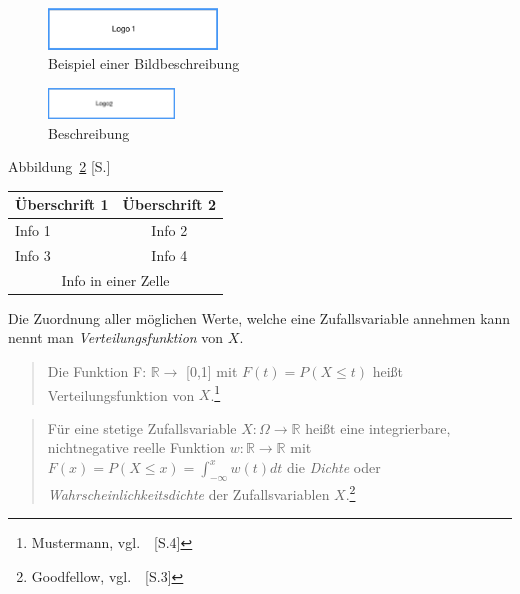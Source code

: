 \begin{figure}[htb]
 \centering
 \includegraphics[width=0.4\textwidth,angle=45]{abb/logo1}
 \caption[Beispiel einer Bildbeschreibung]{Beispiel einer Bildbeschreibung\footnotemark}
\label{fig:beispiel1}
\end{figure}

\begin{figure}[htb]
 \centering
 \includegraphics[width=0.3\textwidth,angle=0]{abb/logo2}
 \caption[Beschreibung]{Beschreibung}
\label{fig:Beschreibung}
\end{figure}

Abbildung~\ref{fig:Beschreibung} [S.\pageref{fig:Beschreibung}]

\begin{center}
  \begin{tabular}{ | l | c | }
    \hline
    Überschrift 1 & Überschrift 2 \\ \hline \hline
    Info 1 & Info 2 \\ \hline
    Info 3 & Info 4 \\ \hline
    \hline
    \multicolumn{2}{|c|}{Info in einer Zelle} \\
    \hline
  \end{tabular}
\end{center}




Die Zuordnung aller möglichen Werte, welche eine Zufallsvariable annehmen kann nennt man \emph{Verteilungsfunktion} von $X$.

\begin{quotation}
Die Funktion F: $\mathbb{R} \rightarrow$ [0,1] mit $F(t) = P (X \le t)$ heißt Verteilungsfunktion von $X$.\footnote{Mustermann, vgl.~\cite{gfnips16}~[S.4]}
\end{quotation}

\begin{quotation}
Für eine stetige Zufallsvariable $X: \Omega \rightarrow \mathbb{R}$ heißt eine integrierbare, nichtnegative reelle Funktion $w: \mathbb{R} \rightarrow \mathbb{R}$ mit $F(x) = P(X \le x) = \int_{-\infty}^{x} w(t)dt$ die \emph{Dichte} oder \emph{Wahrscheinlichkeitsdichte} der Zufallsvariablen $X$.\footnote{Goodfellow, vgl.~\cite{gfg14}~[S.3]}
\end{quotation}
